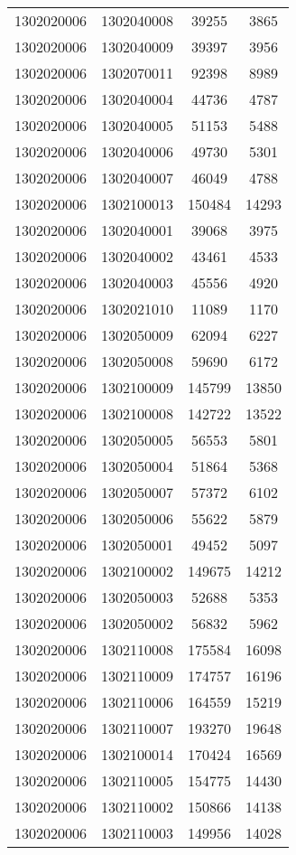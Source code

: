 \begin{longtable}{llcc}
1302020006 & 1302040008 & 39255 & 3865\\
1302020006 & 1302040009 & 39397 & 3956\\
1302020006 & 1302070011 & 92398 & 8989\\
1302020006 & 1302040004 & 44736 & 4787\\
1302020006 & 1302040005 & 51153 & 5488\\
1302020006 & 1302040006 & 49730 & 5301\\
1302020006 & 1302040007 & 46049 & 4788\\
1302020006 & 1302100013 & 150484 & 14293\\
1302020006 & 1302040001 & 39068 & 3975\\
1302020006 & 1302040002 & 43461 & 4533\\
1302020006 & 1302040003 & 45556 & 4920\\
1302020006 & 1302021010 & 11089 & 1170\\
1302020006 & 1302050009 & 62094 & 6227\\
1302020006 & 1302050008 & 59690 & 6172\\
1302020006 & 1302100009 & 145799 & 13850\\
1302020006 & 1302100008 & 142722 & 13522\\
1302020006 & 1302050005 & 56553 & 5801\\
1302020006 & 1302050004 & 51864 & 5368\\
1302020006 & 1302050007 & 57372 & 6102\\
1302020006 & 1302050006 & 55622 & 5879\\
1302020006 & 1302050001 & 49452 & 5097\\
1302020006 & 1302100002 & 149675 & 14212\\
1302020006 & 1302050003 & 52688 & 5353\\
1302020006 & 1302050002 & 56832 & 5962\\
1302020006 & 1302110008 & 175584 & 16098\\
1302020006 & 1302110009 & 174757 & 16196\\
1302020006 & 1302110006 & 164559 & 15219\\
1302020006 & 1302110007 & 193270 & 19648\\
1302020006 & 1302100014 & 170424 & 16569\\
1302020006 & 1302110005 & 154775 & 14430\\
1302020006 & 1302110002 & 150866 & 14138\\
1302020006 & 1302110003 & 149956 & 14028\\

\end{longtable}
